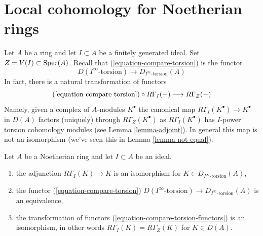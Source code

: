 \section{Local cohomology for Noetherian rings}
\label{section-local-cohomology-noetherian}

\noindent
Let $A$ be a ring and let $I \subset A$ be a finitely generated ideal.
Set $Z = V(I) \subset \mathop{\mathrm{Spec}}(A)$. Recall that (\ref{equation-compare-torsion})
is the functor
$$
D(I^\infty\text{-torsion}) \to D_{I^\infty\text{-torsion}}(A)
$$
In fact, there is a natural transformation of functors
\begin{equation}
\label{equation-compare-torsion-functors}
(\ref{equation-compare-torsion}) \circ R\Gamma_I(-)
\longrightarrow
R\Gamma_Z(-)
\end{equation}
Namely, given a complex of $A$-modules $K^\bullet$ the canonical map
$R\Gamma_I(K^\bullet) \to K^\bullet$ in $D(A)$ factors (uniquely)
through $R\Gamma_Z(K^\bullet)$ as $R\Gamma_I(K^\bullet)$ has
$I$-power torsion cohomology modules (see Lemma \ref{lemma-adjoint}).
In general this map is not an isomorphism (we've seen this in
Lemma \ref{lemma-not-equal}).

\begin{lemma}
\label{lemma-local-cohomology-noetherian}
Let $A$ be a Noetherian ring and let $I \subset A$ be an ideal.
\begin{enumerate}
\item the adjunction $R\Gamma_I(K) \to K$ is an isomorphism
for $K \in D_{I^\infty\text{-torsion}}(A)$,
\item the functor
(\ref{equation-compare-torsion})
$D(I^\infty\text{-torsion}) \to D_{I^\infty\text{-torsion}}(A)$
is an equivalence,
\item the transformation of functors
(\ref{equation-compare-torsion-functors}) is an isomorphism,
in other words $R\Gamma_I(K) = R\Gamma_Z(K)$ for $K \in D(A)$.
\end{enumerate}
\end{lemma}

